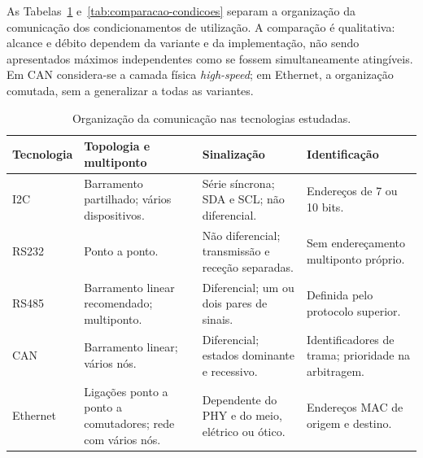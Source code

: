 As Tabelas~\ref{tab:comparacao-organizacao}
e~\ref{tab:comparacao-condicoes} separam a organização da comunicação
dos condicionamentos de utilização. A comparação é qualitativa:
alcance e débito dependem da variante e da implementação, não sendo
apresentados máximos independentes como se fossem simultaneamente
atingíveis. Em CAN considera-se a camada física \textit{high-speed};
em Ethernet, a organização comutada, sem a generalizar a todas
as variantes.

\begin{table}[htbp]
    \centering
    \small
    \setlength{\tabcolsep}{4pt}
    \renewcommand{\arraystretch}{1.12}
    \caption{Organização da comunicação nas tecnologias estudadas.}
    \label{tab:comparacao-organizacao}
    \begin{tabularx}{\textwidth}{@{}>{\raggedright\arraybackslash}p{}*{3}{>{\raggedright\arraybackslash}X}@{}}
        \toprule
\rowcolor{LasetTint}
        Tecnologia & Topologia e multiponto & Sinalização & Identificação \\
        \midrule
        I2C~\cite{nxp_um10204_2021}
        & Barramento partilhado; vários dispositivos.
        & Série síncrona; SDA e SCL; não diferencial.
        & Endereços de 7 ou 10 bits. \\
        \addlinespace
        RS232~\cite{dodson_rs232_2023}
        & Ponto a ponto.
        & Não diferencial; transmissão e receção separadas.
        & Sem endereçamento multiponto próprio. \\
        \addlinespace
        RS485~\cite{ti_rs485_an1057_2013}
        & Barramento linear recomendado; multiponto.
        & Diferencial; um ou dois pares de sinais.
        & Definida pelo protocolo superior. \\
        \addlinespace
        CAN~\cite{cia_can_cc,cia_can_hs}
        & Barramento linear; vários nós.
        & Diferencial; estados dominante e recessivo.
        & Identificadores de trama; prioridade na arbitragem. \\
        \addlinespace
        Ethernet~\cite{simmons_ethernet_2008,ieee_8023_2018}
        & Ligações ponto a ponto a comutadores; rede com vários nós.
        & Dependente do PHY e do meio, elétrico ou ótico.
        & Endereços MAC de origem e destino. \\
        \bottomrule
    \end{tabularx}
\end{table}

